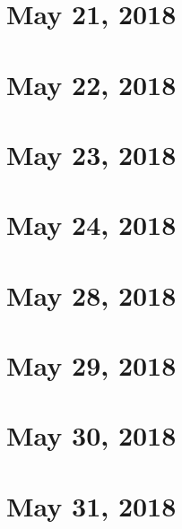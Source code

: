 \documentclass{article}
\begin{document}

\section{May 21, 2018}
\newpage


\section{May 22, 2018}
\newpage


\section{May 23, 2018}
\newpage


\section{May 24, 2018}
\newpage


\section{May 28, 2018}
\newpage


\section{May 29, 2018}
\newpage


\section{May 30, 2018}
\newpage


\section{May 31, 2018}
\newpage
\end{document}
